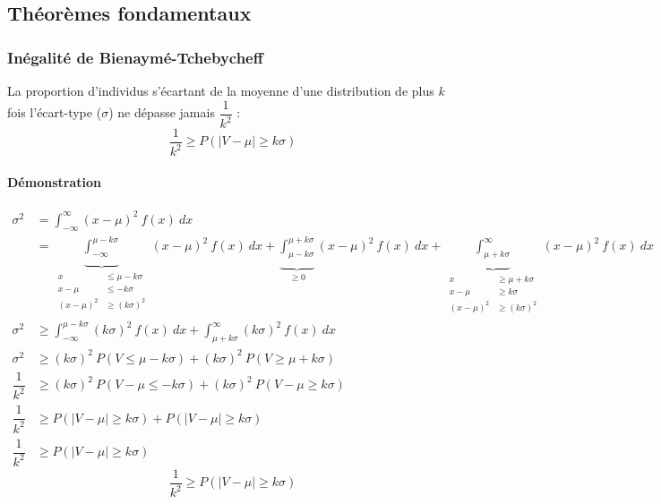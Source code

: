 \newpage
\subsection{Théorèmes fondamentaux}






\subsubsection{Inégalité de Bienaymé-Tchebycheff}
La proportion d'individus s'écartant de la moyenne d'une distribution de plus $k$ fois l'écart-type ($\sigma$) ne dépasse jamais $\dfrac{1}{k^2}$ :
$$\boxed{\dfrac{1}{k^2} \geq P(|V-\mu|\geq k\sigma)}$$
\paragraph{Démonstration}
\begin{align*}
	\sigma^2 &= \int_{-\infty}^{\infty} (x-\mu)^2\ f(x)\ dx\\
             &= \underbrace{\int_{-\infty}^{\mu-k\sigma}}_{\begin{aligned}x&\leq\mu-k\sigma\\x-\mu&\leq -k\sigma\\(x-\mu)^2&\geq(k\sigma)^2\end{aligned}} (x-\mu)^2\ f(x)\ dx + \underbrace{\int_{\mu-k\sigma}^{\mu+k\sigma}}_{\geq0} (x-\mu)^2\ f(x)\ dx + \underbrace{\int_{\mu+k\sigma}^{\infty}}_{\begin{aligned}x&\geq\mu+k\sigma\\x-\mu&\geq k\sigma\\(x-\mu)^2&\geq(k\sigma)^2\end{aligned}} (x-\mu)^2\ f(x)\ dx\\
    \sigma^2 &\geq \int_{-\infty}^{\mu-k\sigma} (k\sigma)^2\ f(x)\ dx + \int_{\mu+k\sigma}^{\infty} (k\sigma)^2\ f(x)\ dx\\
    \sigma^2 &\geq (k\sigma)^2\ P(V\leq\mu-k\sigma) + (k\sigma)^2\ P(V\geq\mu+k\sigma)\\
    \dfrac{1}{k^2} &\geq (k\sigma)^2\ P(V-\mu\leq-k\sigma) + (k\sigma)^2\ P(V-\mu\geq k\sigma)\\
    \dfrac{1}{k^2} &\geq P(|V-\mu|\geq k\sigma) + P(|V-\mu|\geq k\sigma)\\
    \dfrac{1}{k^2} &\geq P(|V-\mu|\geq k\sigma)
\end{align*}
$$\boxed{\dfrac{1}{k^2} \geq P(|V-\mu|\geq k\sigma)}$$







